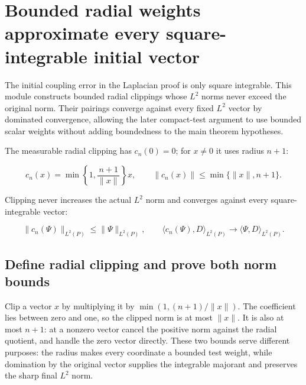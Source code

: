 \documentclass[11pt,a4paper]{report}
\begin{document}
\section{\texorpdfstring{Bounded radial weights approximate every square-integrable initial vector}{Bounded radial weights approximate every square-integrable initial vector}}
\label{proof-module-AverageLMC-LaplacianWeightClipping-lean}


The initial coupling error in the Laplacian proof is only square integrable. This module constructs bounded radial clippings whose \(L^{2}\) norms never exceed the original norm. Their pairings converge against every fixed \(L^{2}\) vector by dominated convergence, allowing the later compact-test argument to use bounded scalar weights without adding boundedness to the main theorem hypotheses.



The measurable radial clipping has \(c_n(0)=0\); for \(x\ne0\) it uses radius \(n+1\):


\[c_n(x)=\min\!\left\{1,\frac{n+1}{\|x\|}\right\}x,
\qquad\|c_n(x)\|\le\min\{\|x\|,n+1\}.\]


Clipping never increases the actual \(L^2\) norm and converges against every square-integrable vector:


\[\|c_n(\Psi)\|_{L^2(P)}\le\|\Psi\|_{L^2(P)},\qquad
\langle c_n(\Psi),D\rangle_{L^2(P)}
\longrightarrow\langle\Psi,D\rangle_{L^2(P)}.\]\subsection{\texorpdfstring{Define radial clipping and prove both norm bounds}{Define radial clipping and prove both norm bounds}}
\label{report-step-AverageLMC-LaplacianWeightClipping-lean-1}


Clip a vector \(x\) by multiplying it by \(\min(1,(n+1)/\|x\|)\). The coefficient lies between zero and one, so the clipped norm is at most \(\|x\|\). It is also at most \(n+1\): at a nonzero vector cancel the positive norm against the radial quotient, and handle the zero vector directly. These two bounds serve different purposes: the radius makes every coordinate a bounded test weight, while domination by the original vector supplies the integrable majorant and preserves the sharp final \(L^{2}\) norm.
\end{document}
